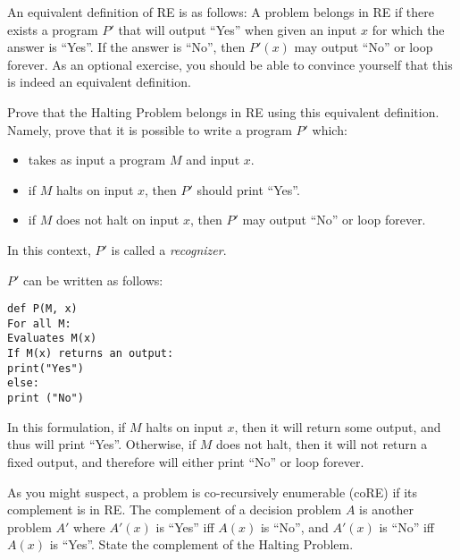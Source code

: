 \documentclass[11pt]{article}
\begin{document}
\begin{Parts}
\begin{solution}
\end{solution}

\Part An equivalent definition of \textsf{RE} is as follows: A problem belongs in \textsf{RE} if there exists a program $P'$ that will output ``Yes'' when given an input $x$ for which the answer is ``Yes''. If the answer is ``No'', then $P'(x)$ may output ``No'' or loop forever. As an optional exercise, you should be able to convince yourself that this is indeed an equivalent definition. 

Prove that the Halting Problem belongs in \textsf{RE} using this equivalent definition. Namely, prove that it is possible to write a program $P'$ which:
  \begin{itemize}
  \item takes as input a program $M$ and input $x$.
  \item if $M$ halts on input $x$, then $P'$ should print ``Yes''.
  \item if $M$ does not halt on input $x$, then $P'$ may output ``No'' or loop forever.
  \end{itemize}

  In this context, $P'$ is called a \emph{recognizer}.

\normalfont

\begin{solution}
  $P'$ can be written as follows: 

  \texttt{def P(M, x)\\
  \phantom{aaa} For all M:\\
  \phantom{aaaaa} Evaluates M(x)\\
  \phantom{aaa} If M(x) returns an output:\\
  \phantom{aaaaa} print("Yes")\\
  \phantom{aaa} else:\\
  \phantom{aaaaa} print ("No")
  }

  In this formulation, if $M$ halts on input $x$, then it will return some output, and thus will print ``Yes''. Otherwise, if $M$ does not halt, then it will not return a fixed output, and therefore will either print ``No'' or loop forever.
\end{solution}

\Part As you might suspect, a problem is co-recursively enumerable (\textsf{coRE}) if its complement is in \textsf{RE}. The complement of a decision problem $A$ is another problem $A'$ where $A'(x)$ is ``Yes'' iff $A(x)$ is ``No'', and $A'(x)$ is ``No'' iff $A(x)$ is ``Yes''.
State the complement of the Halting Problem.


\end{Parts}
\end{document}
